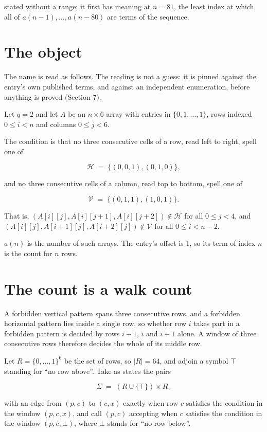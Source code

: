 \documentclass[11pt]{article}
\theoremstyle{definition}
\begin{document}
stated without a range; it first has meaning at $n = 81$, the least index at which all of $a(n-1),\dots,a(n-80)$ are terms of the sequence.

\section{The object}

The name is read as follows. The reading is not a guess: it is pinned against the entry's own published terms, and against an independent enumeration, before anything is proved (Section 7).

Let $q = 2$ and let $A$ be an $n \times 6$ array with entries in $\{0,1,\dots,1\}$, rows indexed $0 \le i < n$ and columns $0 \le j < 6$.

The condition is that no three consecutive cells of a row, read left to right, spell one of

\[\mathcal{H} \;=\; \{(0,0,1), (0,1,0)\},\]

and no three consecutive cells of a column, read top to bottom, spell one of

\[\mathcal{V} \;=\; \{(0,1,1), (1,0,1)\}.\]

That is, $(A[i][j],A[i][j{+}1],A[i][j{+}2]) \notin \mathcal{H}$ for all $0 \le j < 4$, and $(A[i][j],A[i{+}1][j],A[i{+}2][j]) \notin \mathcal{V}$ for all $0 \le i < n-2$.

$a(n)$ is the number of such arrays. The entry's offset is 1, so its term of index $n$ is the count for $n$ rows.

\section{The count is a walk count}

A forbidden vertical pattern spans three consecutive rows, and a forbidden horizontal pattern lies inside a single row, so whether row $i$ takes part in a forbidden pattern is decided by rows $i-1$, $i$ and $i+1$ alone. A window of three consecutive rows therefore decides the whole of its middle row.

Let $R = \{0,\dots,1\}^{6}$ be the set of rows, so $|R| = 64$, and adjoin a symbol $\top$ standing for ``no row above''. Take as states the pairs

\[\Sigma \;=\; (R \cup \{\top\}) \times R,\]

with an edge from $(p,c)$ to $(c,x)$ exactly when row $c$ satisfies the condition in the window $(p,c,x)$, and call $(p,c)$ accepting when $c$ satisfies the condition in the window $(p,c,\bot)$, where $\bot$ stands for ``no row below''.
\end{document}
